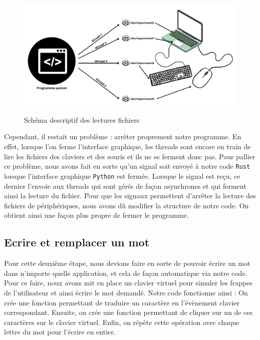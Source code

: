 \documentclass[a4paper, 11pt]{report}
\newcommand{\langage}[1]{\texttt{#1}}
\begin{document}
{\begin{figure}[H]
	\begin{center}
		{\includegraphics[width=\textwidth]{images/lecture-fichier.png}}
	\end{center}
	\caption{Schéma descriptif des lectures fichiers}
	\label{fig:lecture_fichier}
\end{figure}

Cependant, il restait un problème : arrêter proprement notre programme. En effet, lorsque l'on ferme l'interface graphique, les threads sont encore en train de lire les fichiers des claviers et des souris et ils ne se ferment donc pas. Pour pallier ce problème, nous avons fait en sorte qu'un signal soit envoyé à notre code \langage{Rust} lorsque l'interface graphique \langage{Python} est fermée. Lorsque le signal est reçu, ce dernier l'envoie aux threads qui sont gérés de façon asynchrones et qui ferment ainsi la lecture du fichier. Pour que les signaux permettent d'arrêter la lecture des fichiers de périphériques, nous avons dû modifier la structure de notre code. On obtient ainsi une façon plus propre de fermer le programme.

\subsection{Ecrire et remplacer un mot}

Pour cette deuxième étape, nous devions faire en sorte de pouvoir écrire un mot dans n'importe quelle application, et cela de façon automatique via notre code. Pour ce faire,  noux avons mit en place un clavier virtuel pour simuler les frappes de l'utilisateur et ainsi écrire le mot demandé. Notre code fonctionne ainsi : On crée une fonction permettant de traduire un caractère en l'évènement clavier correspondant. Ensuite, on crée une fonction permettant de cliquer sur un de ces caractères sur le clavier virtuel. Enfin, on répète cette opération avec chaque lettre du mot pour l'écrire en entier.\\

}
\end{document}

